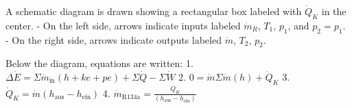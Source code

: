A schematic diagram is drawn showing a rectangular box labeled with \( \dot{Q}_K \) in the center.  
- On the left side, arrows indicate inputs labeled \( \dot{m}_R \), \( T_1 \), \( p_1 \), and \( p_2 = p_1 \).  
- On the right side, arrows indicate outputs labeled \( \dot{m} \), \( T_2 \), \( p_2 \).  

Below the diagram, equations are written:  
1. \( \Delta \dot{E} = \Sigma \dot{m}_{\text{in}} (h + ke + pe) + \Sigma \dot{Q} - \Sigma \dot{W} \)  
2. \( 0 = \dot{m} \Sigma \dot{m} (h) + \dot{Q}_K \)  
3. \( \dot{Q}_K = \dot{m} (h_{\text{aus}} - h_{\text{ein}}) \)  
4. \( \dot{m}_{\text{R134a}} = \frac{\dot{Q}_K}{(h_{\text{aus}} - h_{\text{ein}})} \)
